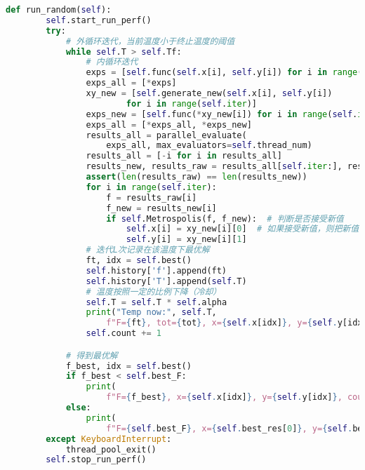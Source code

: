 \begin{lstlisting}[language=Python,breaklines=true]
    def run_random(self):
        self.start_run_perf()
        try:
            # 外循环迭代，当前温度小于终止温度的阈值
            while self.T > self.Tf:
                # 内循环迭代
                exps = [self.func(self.x[i], self.y[i]) for i in range(self.iter)]
                exps_all = [*exps]
                xy_new = [self.generate_new(self.x[i], self.y[i])
                        for i in range(self.iter)]
                exps_new = [self.func(*xy_new[i]) for i in range(self.iter)]
                exps_all = [*exps_all, *exps_new]
                results_all = parallel_evaluate(
                    exps_all, max_evaluators=self.thread_num)
                results_all = [-i for i in results_all]
                results_new, results_raw = results_all[self.iter:], results_all[:self.iter]
                assert(len(results_raw) == len(results_new))
                for i in range(self.iter):
                    f = results_raw[i]
                    f_new = results_new[i]
                    if self.Metrospolis(f, f_new):  # 判断是否接受新值
                        self.x[i] = xy_new[i][0]  # 如果接受新值，则把新值的x,y存入x数组和y数组
                        self.y[i] = xy_new[i][1]
                # 迭代L次记录在该温度下最优解
                ft, idx = self.best()
                self.history['f'].append(ft)
                self.history['T'].append(self.T)
                # 温度按照一定的比例下降（冷却）
                self.T = self.T * self.alpha
                print("Temp now:", self.T,
                    f"F={ft}, tot={tot}, x={self.x[idx]}, y={self.y[idx]}")
                self.count += 1

            # 得到最优解
            f_best, idx = self.best()
            if f_best < self.best_F:
                print(
                    f"F={f_best}, x={self.x[idx]}, y={self.y[idx]}, count={self.count}")
            else:
                print(
                    f"F={self.best_F}, x={self.best_res[0]}, y={self.best_res[1]}, count={self.count}")
        except KeyboardInterrupt:
            thread_pool_exit()
        self.stop_run_perf()


\end{lstlisting}
